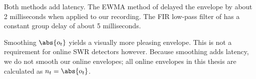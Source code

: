 Both methods add latency. The EWMA method of \citeauthor*{Jadhav2012} delayed the envelope by about 2 milliseconds when applied to our recording. The FIR low-pass filter of \citeauthor*{Dutta2018} has a constant group delay of about 5 milliseconds.

Smoothing $\abs{o_t}$ yields a visually more pleasing envelope. This is not a requirement for online SWR detectors however. Because smoothing adds latency, we do not smooth our online envelopes; all online envelopes in this thesis are calculated as $n_t = \abs{o_t}$.










\clearpage
\begin{figure}
\end{figure}

\begin{figure}
\end{figure}
